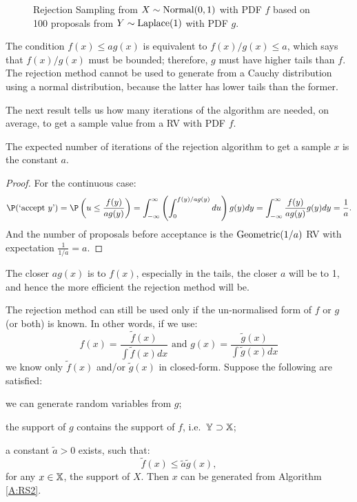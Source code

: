 \begin{figure}[htpb]
\caption{Rejection Sampling from $X \sim \mbox{{\rm Normal}}(0,1)$ with PDF $f$ based on  100 proposals from $Y \sim \mbox{{\rm Laplace}}(1)$ with PDF $g$.\label{F:RSNormalLaplace}}
\centering   {}
\end{figure}

\begin{classwork}
The condition $f(x)\leq ag(x)$ is equivalent to $f(x)/g(x)\leq a$, which says that $f(x)/g(x)$ must be bounded; therefore, $g$ must have higher tails than $f$.
The rejection method cannot be used to generate from a Cauchy distribution using a normal distribution, because the latter has lower tails than the former.
\end{classwork}


The next result tells us how many iterations of the algorithm are needed, on average, to get a sample value from a RV with PDF $f$.

\begin{prop} The expected number of iterations of the rejection algorithm to get a sample $x$ is the constant $a$.

\begin{proof}
For the continuous case:
\begin{displaymath}
\P(\textrm{`accept }y\textrm{'})=\P\left( u\leq \frac{f(y)}{ag(y)}\right)=\int^{\infty}_{-\infty}\left(\int^{f(y)/ag(y)}_0du\right)g(y)dy=\int^{\infty}_{-\infty}\frac{f(y)}{ag(y)}g(y)dy=\frac{1}{a}.
\end{displaymath}
And the number of proposals before acceptance is the $\mbox{{\rm Geometric}}(1/a)$ RV with expectation $\frac{1}{1/a}=a$.
\end{proof}
\end{prop}

The closer $ag(x)$ is to $f(x)$, especially in the tails, the closer $a$ will be to 1, and hence the more efficient the rejection method will be.

The rejection method can still be used only if the un-normalised form of $f$ or $g$ (or both) is known. In other words, if we use:
$$f(x)=\frac{\tilde{f}(x)}{\int \tilde{f}(x)dx} \textrm{ and } g(x)=\frac{\tilde{g}(x)}{\int \tilde{g}(x)dx} $$
we know only $\tilde{f} (x)$ and/or $\tilde{g}(x)$ in closed-form.  Suppose the following are satisfied:
\begin{asparaenum}[(a)]
\item	we can generate random variables from $g$;
\item	the support of $g$ contains the support of $f$, i.e.~$\mathbb{Y} \supset \mathbb{X}$;
\item	a constant $\tilde{a} > 0$ exists, such that:
\begin{equation}
\tilde{f}(x)\leq\tilde{a}\tilde{g}(x),
\end{equation}
for any $x\in \mathbb{X}$, the support of $X$.  Then $x$ can be generated from Algorithm \ref*{A:RS2}.
\end{asparaenum}

